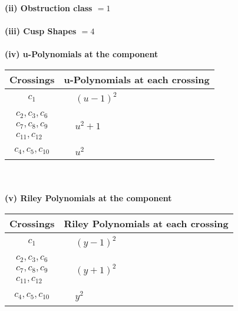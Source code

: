 \documentclass[1p]{elsarticle_modified}
\theoremstyle{definition}
\begin{document}
\flushleft \textbf{(ii) Obstruction class $= 1$}\\~\\
\flushleft \textbf{(iii) Cusp Shapes $= 4$}\\~\\
\newpage\renewcommand{\arraystretch}{1}
\flushleft \textbf{(iv) u-Polynomials at the component}\newline \\
\begin{tabular}{m{50pt}|m{274pt}}
Crossings & \hspace{64pt}u-Polynomials at each crossing \\
\hline $$\begin{aligned}c_{1}\end{aligned}$$&$\begin{aligned}
&(u-1)^2
\end{aligned}$\\
\hline $$\begin{aligned}c_{2},c_{3},c_{6}\\c_{7},c_{8},c_{9}\\c_{11},c_{12}\end{aligned}$$&$\begin{aligned}
&u^2+1
\end{aligned}$\\
\hline $$\begin{aligned}c_{4},c_{5},c_{10}\end{aligned}$$&$\begin{aligned}
&u^2
\end{aligned}$\\
\hline
\end{tabular}\\~\\
\newpage\renewcommand{\arraystretch}{1}
\flushleft \textbf{(v) Riley Polynomials at the component}\newline \\
\begin{tabular}{m{50pt}|m{274pt}}
Crossings & \hspace{64pt}Riley Polynomials at each crossing \\
\hline $$\begin{aligned}c_{1}\end{aligned}$$&$\begin{aligned}
&(y-1)^2
\end{aligned}$\\
\hline $$\begin{aligned}c_{2},c_{3},c_{6}\\c_{7},c_{8},c_{9}\\c_{11},c_{12}\end{aligned}$$&$\begin{aligned}
&(y+1)^2
\end{aligned}$\\
\hline $$\begin{aligned}c_{4},c_{5},c_{10}\end{aligned}$$&$\begin{aligned}
&y^2
\end{aligned}$\\
\hline
\end{tabular}\\~\\
\end{document}
